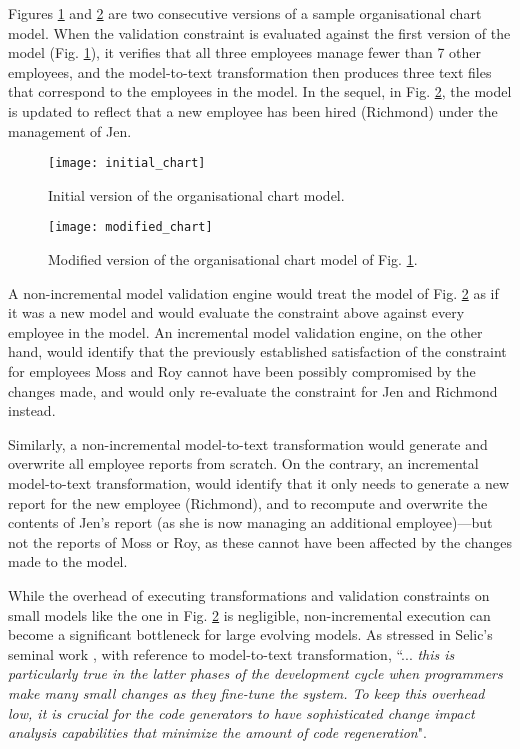 Figures \ref{fig:initial_chart} and \ref{fig:modified_chart} are two consecutive versions of a sample organisational chart model. When the validation constraint is evaluated against the first version of the model (Fig. \ref{fig:initial_chart}), it verifies that all three employees manage fewer than 7 other employees, and the model-to-text transformation then produces three text files that correspond to the employees in the model. In the sequel, in Fig. \ref{fig:modified_chart}, the model is updated to reflect that a new employee has been hired (Richmond) under the management of Jen. 

\begin{figure}[b!]
    \centering
    \texttt{[image: initial\_chart]}
    \caption{Initial version of the organisational chart model.}
    \label{fig:initial_chart}
\end{figure}

\begin{figure}[b!]
    \centering
    \texttt{[image: modified\_chart]}
    \caption{Modified version of the organisational chart model of Fig. \ref{fig:initial_chart}.}
    \label{fig:modified_chart}
\end{figure}

A non-incremental model validation engine would treat the model of Fig. \ref{fig:modified_chart} as if it was a new model and would evaluate the constraint above against every employee in the model. An incremental model validation engine, on the other hand, would identify that the previously established satisfaction of the constraint for employees Moss and Roy cannot have been possibly compromised by the changes made, and would only re-evaluate the constraint for Jen and Richmond instead. 

Similarly, a non-incremental model-to-text transformation would generate and overwrite all employee reports from scratch. On the contrary, an incremental model-to-text transformation, would identify that it only needs to generate a new report for the new employee (Richmond), and to recompute and overwrite the contents of Jen's report (as she is now managing an additional employee)---but not the reports of Moss or Roy, as these cannot have been affected by the changes made to the model.

While the overhead of executing transformations and validation constraints on small models like the one in Fig. \ref{fig:modified_chart} is negligible, non-incremental execution can become a significant bottleneck for large evolving models. As stressed in Selic's seminal work \cite{selic2003pragmatics}, with reference to model-to-text transformation, ``... \emph{this is particularly true in the latter phases of the development cycle when programmers make many small changes as they fine-tune the system. To keep this overhead low, it is crucial for the code generators to have sophisticated change impact analysis capabilities that minimize the amount of code regeneration}".

